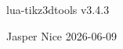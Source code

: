 \begin{titlepage}
    \vspace*{.35\textheight}
    \Large\centering lua-tikz3dtools v3.4.3\par
    \vfill\raggedright Jasper Nice \hfill 2026-06-09
\end{titlepage}